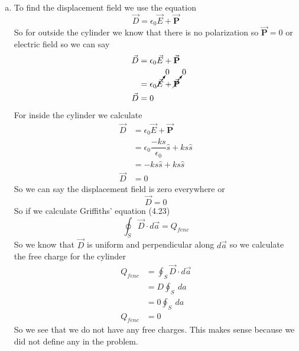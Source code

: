 \documentclass[11pt]{article}
\numberwithin{equation}{section}
\newcommand{\vecE}{\vec{E}}
\newcommand{\vecP}{\vec{\mathbf{P}}}
\begin{document}
\begin{enumerate}[(a)]
\item
To find the displacement field we use the equation
\begin{equation}
\vec{D} = \epsilon_0 \vecE+\vecP
\label{disp}
\end{equation}
So for outside the cylinder we know that there is no polarization so $\vecP =0$ or electric field so we can say
\begin{align*}
\vec{D} &= \epsilon_0 \vecE+\vecP\\
&= \epsilon_0 \cancelto{0}{\vecE}+\cancelto{0}{\vecP}\\
\vec{D} &=0
\end{align*}
For inside the cylinder we calculate
\begin{align*}
\vec{D} &= \epsilon_0 \vecE+\vecP\\
&= \epsilon_0 \dfrac{-ks}{\epsilon_0}\hat{s}+ks\hat{s}\\
&= -ks\hat{s}+ks\hat{s}\\
\vec{D} &= 0
\end{align*}
So we can say the displacement field is zero everywhere or
$$\vec{D} = 0$$
So if we calculate Griffiths' equation (4.23)
$$\oint_S\vec{D}\cdot d\vec{a} = Q_{fenc}$$
So we know that $\vec{D}$ is uniform and perpendicular along $d\vec{a}$ so we calculate the free charge for the cylinder
\begin{align*}
Q_{fenc} &= \oint_S\vec{D}\cdot d\vec{a} \\
&= D\oint_S\ d{a} \\
&= 0\oint_S\ d{a} \\
Q_{fenc} &= 0
\end{align*}
So we see that we do not have any free charges. This makes sense because we did not define any in the problem.
\end{enumerate}
\end{document}
